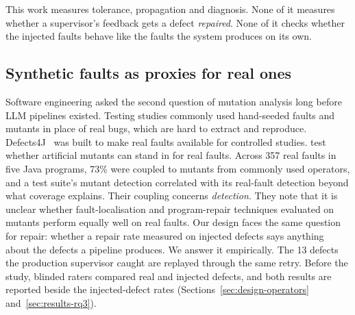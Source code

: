 This work measures tolerance, propagation and diagnosis. None of it measures
whether a supervisor's feedback gets a defect \emph{repaired}. None of it checks
whether the injected faults behave like the faults the system produces on its
own.

\subsection{Synthetic faults as proxies for real ones}
\label{sec:related-proxy}

Software engineering asked the second question of mutation analysis long
before LLM pipelines existed. Testing studies commonly used hand-seeded faults
and mutants in place of real bugs, which are hard to extract and reproduce.
Defects4J~\citep{just2014defects4j} was built to make real faults available
for controlled studies. \citet{just2014mutants} test whether artificial
mutants can stand in for real faults. Across 357 real faults in five Java
programs, 73\% were coupled to mutants from commonly used operators, and a
test suite's mutant detection correlated with its real-fault detection beyond
what coverage explains. Their coupling concerns \emph{detection}. They note that
it is unclear whether fault-localisation and program-repair techniques
evaluated on mutants perform equally well on real faults. Our design faces the
same question for repair: whether a repair rate measured on injected defects
says anything about the defects a pipeline produces. We answer it empirically.
The 13 defects the production supervisor caught are replayed through the same
retry. Before the study, blinded raters compared real and injected defects, and
both results are reported beside the injected-defect rates
(Sections~\ref{sec:design-operators} and~\ref{sec:results-rq3}).
